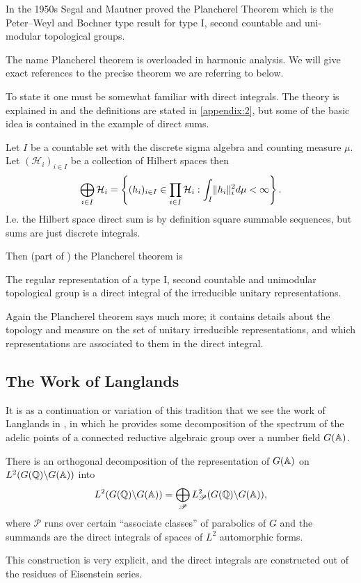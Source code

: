 In the 1950s Segal and Mautner proved the Plancherel Theorem which is the Peter--Weyl and Bochner type result for type I, second countable and uni-modular topological groups.
\begin{remark}
	The name Plancherel theorem is overloaded in harmonic analysis. We will give exact references to the precise theorem we are referring to below.
\end{remark}
 To state it one must be somewhat familiar with direct integrals. The theory is explained in \cite[7.4]{follandCourseAbstractHarmonic2016a} and the definitions are stated in \ref{appendix:2}, but some of the basic idea is contained in the example of direct sums.
\begin{example}
	Let \(I\) be a countable set with the discrete sigma algebra and counting measure \(\mu\). Let \((\mathcal{H}_i)_{i\in I}\) be a collection of Hilbert spaces then
	\[\bigoplus_{i\in I} \mathcal{H}_i = \left\{ (h_i)_{i\in I}\in \prod_{i\in I} \mathcal{H}_i : \int_I \lVert h_i \rVert_i^2 d\mu <\infty \right\}.\]
	I.e. the Hilbert space direct sum is by definition square summable sequences, but sums are just discrete integrals.
\end{example}
Then (part of ) the Plancherel theorem is
\begin{Theorem}
	The regular representation of a type I, second countable and unimodular topological group is a direct integral of the irreducible unitary representations. 
\end{Theorem}
\begin{remark}
	Again the Plancherel theorem says much more; it contains details about the topology and measure on the set of unitary irreducible representations, and which representations are associated to them in the direct integral.
\end{remark}

\subsection{The Work of Langlands}
It is as a continuation or variation of this tradition that we see the work of Langlands in \cite{langlandsFunctionalEquationsSatisfied1976}, in which he provides some decomposition of the spectrum of the adelic points of a connected reductive algebraic group over a number field \(G(\A)\).

\begin{Theorem}
	There is an orthogonal decomposition of the representation of \(G(\A)\) on \(L^2(G(\Q) \backslash G(\A))\) into 
	\[L^2(G(\Q) \backslash G(\A)) = \bigoplus_{\mathscr{P}}L^2_\mathscr{P}(G(\Q) \backslash G(\A)),\]
	where \(\mathscr{P}\) runs over certain ``associate classes'' of parabolics of \(G\) and the summands are the direct integrals of spaces of \(L^2\) automorphic forms.
\end{Theorem}
This construction is very explicit, and the direct integrals are constructed out of the residues of Eisenstein series.

